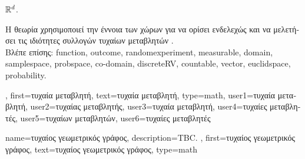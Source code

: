 {{\begin{itemize}
				 $\mathbb{R}^{d}$.  
 		\end{itemize} 
 		\foreignlanguage{greek}{Η θεωρία}  \foreignlanguage{greek}{χρησιμοποιεί την έννοια των} 
		 \foreignlanguage{greek}{χώρων για να ορίσει ενδελεχώς και να μελετήσει τις ιδιότητες συλλογών 
		τυχαίων μεταβλητών} \cite{BillingsleyProbMeasure}.
		\\
		\foreignlanguage{greek}{Βλέπε επίσης:} \gls{function}, \gls{outcome}, \gls{randomexperiment}, \gls{measurable}, \gls{domain}, 
		\gls{samplespace}, \gls{probspace}, \gls{co-domain}, \gls{discreteRV}, \gls{countable}, \gls{vector}, \gls{euclidspace}, \gls{probability}.}, 
	first={\foreignlanguage{greek}{τυχαία μεταβλητή}},
	text={\foreignlanguage{greek}{τυχαία μεταβλητή}},
	type=math,
	user1={\foreignlanguage{greek}{τυχαία μεταβλητή}}, %
	user2={\foreignlanguage{greek}{τυχαί\-ας μεταβλητής}}, %
	user3={\foreignlanguage{greek}{τυχαία μεταβλητή}}, %
	user4={\foreignlanguage{greek}{τυχαίες μεταβλητές}}, %
	user5={\foreignlanguage{greek}{τυχαίων μεταβλητών}}, %
	user6={\foreignlanguage{greek}{τυχαίες μεταβλητές}} %
}

{name={\foreignlanguage{greek}{τυχαίος γεωμετρικός γράφος}},
	description={TBC. },
    	first={\foreignlanguage{greek}{τυχαίος γεωμετρικός γράφος}},
    	text={\foreignlanguage{greek}{τυχαίος γεωμετρικός γράφος}},
	type=math
}

